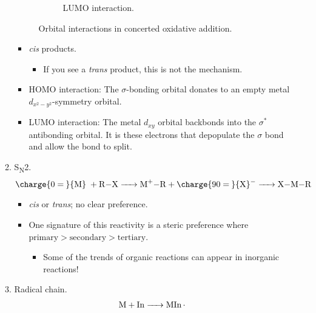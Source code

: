 \documentclass[../notes.tex]{subfiles}
\begin{document}
\begin{itemize}
\begin{enumerate}
\begin{figure}[H]
\begin{subfigure}[b]{0.35\linewidth}
                \caption{LUMO interaction.}
                \label{fig:oxAdn-concerted-orbitalsb}
            \end{subfigure}
            \caption{Orbital interactions in concerted oxidative addition.}
            \label{fig:oxAdn-concerted-orbitals}
        \end{figure}
        \begin{itemize}
            \item \emph{cis} products.
            \begin{itemize}
                \item If you see a \emph{trans} product, this is not the mechanism.
            \end{itemize}
            \item HOMO interaction: The  $\sigma$-bonding orbital donates to an empty metal $d_{x^2-y^2}$-symmetry orbital.
            \item LUMO interaction: The metal $d_{xy}$ orbital backbonds into the  $\sigma^*$ antibonding orbital. It is these electrons that depopulate the $\sigma$ bond and allow the  bond to split.
        \end{itemize}
        \item S\textsubscript{N}2.
        \begin{equation*}
            \ce{\charge{0=\:}{M}\; + R-X -> M^+-R + \charge{90=\:}{X}^- -> X-M-R}
        \end{equation*}
        \begin{itemize}
            \item \emph{cis} or \emph{trans}; no clear preference.
            \item One signature of this reactivity is a steric preference where $\text{primary}>\text{secondary}>\text{tertiary}$.
            \begin{itemize}
                \item Some of the trends of organic reactions can appear in inorganic reactions!
            \end{itemize}
        \end{itemize}
        \item Radical chain.
        \begin{align*}
            \ce{M + In} &\ce{->} \ce{MIn*}\\

\end{align*}
\end{enumerate}
\end{itemize}
\end{document}
